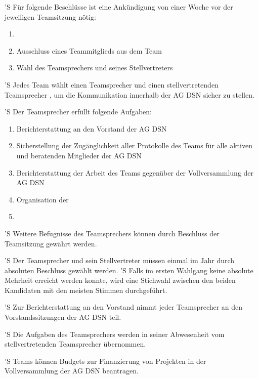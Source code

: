 \documentclass[draft,parskip=half-,DIV=12,mpinclude]{scrartcl}
\begin{document}
\begin{contract}
'S Für folgende Beschlüsse ist eine Ankündigung von einer Woche vor der jeweiligen Teamsitzung nötig:
\begin{enumerate}
  \item {}
  \item Ausschluss eines Teammitglieds aus dem Team
  \item Wahl des Teamsprechers und seines Stellvertreters
\end{enumerate}


'S Jedes Team wählt einen Teamsprecher und einen stellvertretenden Teamsprecher , um die Kommunikation innerhalb der AG DSN sicher zu stellen.

'S Der Teamsprecher erfüllt folgende Aufgaben:
\begin{enumerate}
  \item Berichterstattung an den Vorstand der AG DSN
  \item Sicherstellung der Zugänglichkeit aller Protokolle des Teams für alle aktiven und beratenden Mitglieder der AG DSN
  \item Berichterstattung der Arbeit des Teams gegenüber der Vollversammlung der AG DSN
  \item Organisation der 
  \item {}
\end{enumerate}

'S Weitere Befugnisse des Teamsprechers können durch Beschluss der Teamsitzung gewährt werden.

'S Der Teamsprecher und sein Stellvertreter müssen einmal im Jahr durch absoluten Beschluss gewählt werden.
'S Falls im ersten Wahlgang keine absolute Mehrheit erreicht werden konnte, wird eine Stichwahl zwischen den beiden Kandidaten mit den meisten Stimmen durchgeführt.

'S Zur Berichterstattung an den Vorstand nimmt jeder Teamsprecher an den Vorstandssitzungen der AG DSN teil.

'S Die Aufgaben des Teamsprechers werden in seiner Abwesenheit vom stellvertretenden Teamsprecher übernommen.


'S Teams können Budgets zur Finanzierung von Projekten in der Vollversammlung der AG DSN beantragen.


\end{contract}
\end{document}

